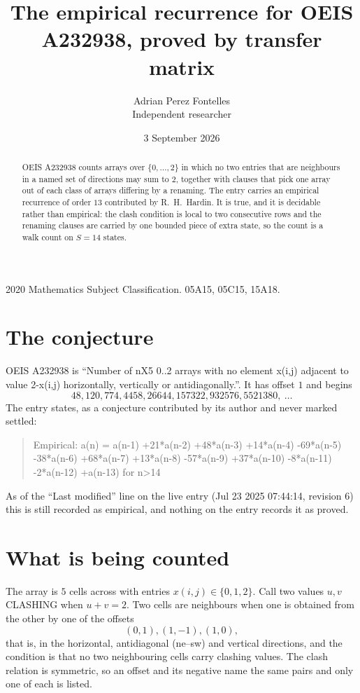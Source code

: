 \documentclass[11pt,a4paper]{article}
\title{The empirical recurrence for OEIS A232938, proved by transfer matrix}
\author{Adrian Perez Fontelles\\ \small Independent researcher}
\date{3 September 2026}
\theoremstyle{plain}
\theoremstyle{definition}
\begin{document}
\maketitle

\begin{abstract}
OEIS A232938 counts arrays over $\{0,\dots,2\}$ in which no two entries that are neighbours in
a named set of directions may sum to $2$, together with clauses that pick one array out of
each class of arrays differing by a renaming. The entry carries an empirical recurrence of
order $13$ contributed by R.~H.~Hardin. It is true, and it is decidable rather than
empirical: the clash condition is local to two consecutive rows and the renaming clauses are
carried by one bounded piece of extra state, so the count is a walk count on $S=14$ states.
\end{abstract}

\noindent\small 2020 Mathematics Subject Classification. 05A15, 05C15, 15A18.\normalsize

\section{The conjecture}

OEIS A232938 is ``Number of nX5 0..2 arrays with no element x(i,j) adjacent to value 2-x(i,j) horizontally, vertically or antidiagonally.''. It has offset $1$ and begins
\[
48, 120, 774, 4458, 26644, 157322, 932576, 5521380,\ \dots
\]
The entry states, as a conjecture contributed by its author and never marked settled:
\begin{quote}
Empirical: a(n) = a(n-1) +21*a(n-2) +48*a(n-3) +14*a(n-4) -69*a(n-5) -38*a(n-6) +68*a(n-7) +13*a(n-8) -57*a(n-9) +37*a(n-10) -8*a(n-11) -2*a(n-12) +a(n-13) for n>14
\end{quote}
As of the ``Last modified'' line on the live entry (Jul 23 2025 07:44:14, revision 6) this is still
recorded as empirical, and nothing on the entry records it as proved.

\section{What is being counted}

The array is $5$ cells across with entries $x(i,j)\in\{0,1,2\}$. Call two values $u,v$ CLASHING
when $u+v=2$. Two cells are neighbours when one is obtained from the other by one of
the offsets
\[
(0,1), (1,-1), (1,0),
\]
that is, in the horizontal, antidiagonal (ne--sw) and vertical directions, and the condition is that no two neighbouring cells carry
clashing values. The clash relation is symmetric, so an offset and its negative name the
same pairs and only one of each is listed.
\end{document}
